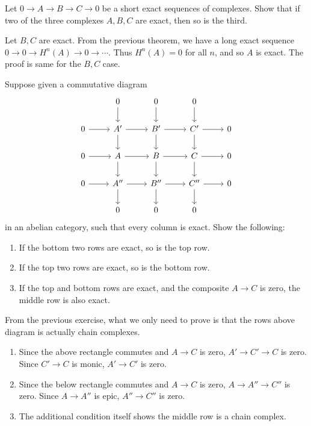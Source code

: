 \begin{exer} Let $0\rightarrow A\rightarrow B\rightarrow C\rightarrow 0$ be a short exact sequences of complexes. Show that if two of the three complexes $A,B,C$ are exact, then so is the third.
\end{exer}
\begin{solution} Let $B,C$ are exact. From the previous theorem, we have a long exact sequence $0\rightarrow 0\rightarrow H^n(A)\rightarrow 0\rightarrow \cdots$. Thus $H^n(A)=0$ for all $n$, and so $A$ is exact. The proof is same for the $B,C$ case.
\end{solution}

\begin{exer} Suppose given a commutative diagram
\begin{equation}
\begin{tikzcd}
&0\arrow{d}&0\arrow{d}&0\arrow{d}&\\
0\arrow{r}&A'\arrow{r}\arrow{d}&B'\arrow{r}\arrow{d}&C'\arrow{r}\arrow{d}&0\\
0\arrow{r}&A\arrow{r}\arrow{d}&B\arrow{r}\arrow{d}&C\arrow{r}\arrow{d}&0\\
0\arrow{r}&A''\arrow{r}\arrow{d}&B''\arrow{r}\arrow{d}&C''\arrow{r}\arrow{d}&0\\
&0&0&0&
\end{tikzcd}
\end{equation}
in an abelian category, such that every column is exact. Show the following:
\begin{enumerate}
\item If the bottom two rows are exact, so is the top row.
\item If the top two rows are exact, so is the bottom row.
\item If the top and bottom rows are exact, and the composite $A\rightarrow C$ is zero, the middle row is also exact.
\end{enumerate}
\end{exer}
\begin{solution}
From the previous exercise, what we only need to prove is that the rows above diagram is actually chain complexes.
\begin{enumerate}
\item Since the above rectangle commutes and $A\rightarrow C$ is zero, $A'\rightarrow C'\rightarrow C$ is zero. Since $C'\rightarrow C$ is monic, $A'\rightarrow C'$ is zero.
\item Since the below rectangle commutes and $A\rightarrow C$ is zero, $A\rightarrow A''\rightarrow C''$ is zero. Since $A\rightarrow A''$ is epic, $A''\rightarrow C''$ is zero.
\item The additional condition itself shows the middle row is a chain complex.
\end{enumerate}
\end{solution}

